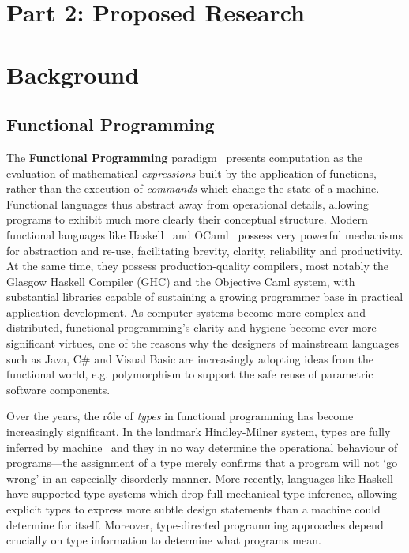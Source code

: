 \documentclass[a4paper]{article}
\begin{document}
\cleardoublepage

\appendix

\section*{Part 2: Proposed Research}

\section{Background}

\subsection*{Functional Programming}
\label{sec:funct-progr}

The \textbf{Functional Programming} paradigm~\cite{backus:fp} presents
computation as the evaluation of mathematical \emph{expressions} built
by the application of functions, rather than the execution of
\emph{commands} which change the state of a machine. Functional
languages thus abstract away from operational details, allowing
programs to exhibit much more clearly their conceptual
structure. Modern functional languages like Haskell~\cite{haskell} and
OCaml~\cite{ocaml} possess very powerful mechanisms for abstraction
and re-use, facilitating brevity, clarity, reliability and
productivity. At the same time, they possess production-quality
compilers, most notably the Glasgow Haskell Compiler (GHC) and the
Objective Caml system, with substantial libraries capable of
sustaining a growing programmer base in practical application
development. As computer systems become more complex and distributed,
functional programming's %
clarity and hygiene become ever more significant virtues, one of the
reasons why the designers of mainstream languages such as Java, C\#{}
and Visual Basic are increasingly adopting ideas from the functional
world, e.g. polymorphism to support the safe reuse of parametric
software components.  

Over the years, the r\^ole of \emph{types} in functional programming has
become increasingly significant. In the landmark Hindley-Milner system, types
are fully inferred by machine~\cite{damas.milner:principal} and they in no
way determine the operational behaviour of programs---the assignment of a
type merely confirms that a program will not `go wrong' in an especially
disorderly manner. More recently, languages like Haskell have supported type
systems which drop full mechanical type inference, allowing
explicit types to express more subtle design statements than a machine
could determine for itself. Moreover, type-directed programming
approaches \cite{wadler.blott:less.ad.hoc,weirich:type-cast} depend
crucially on type information to determine what programs mean.
\end{document}
